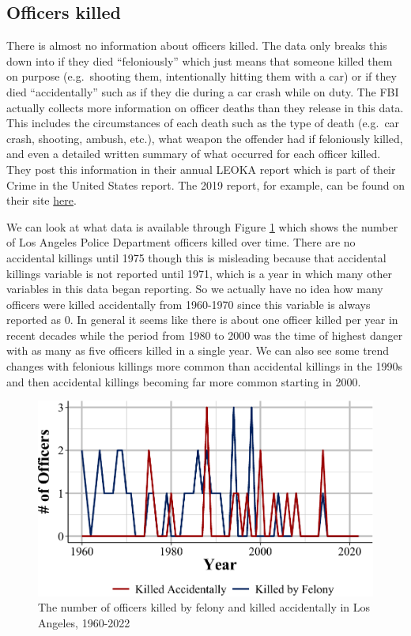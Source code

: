 \documentclass[
  12pt,
  openany]{book}
\begin{document}
\subsection{Officers killed}\label{officers-killed}

There is almost no information about officers killed. The data only breaks this down into if they died ``feloniously'' which just means that someone killed them on purpose (e.g.~shooting them, intentionally hitting them with a car) or if they died ``accidentally'' such as if they die during a car crash while on duty. The FBI actually collects more information on officer deaths than they release in this data. This includes the circumstances of each death such as the type of death (e.g.~car crash, shooting, ambush, etc.), what weapon the offender had if feloniously killed, and even a detailed written summary of what occurred for each officer killed. They post this information in their annual LEOKA report which is part of their Crime in the United States report. The 2019 report, for example, can be found on their site \href{https://ucr.fbi.gov/leoka/2019/home}{here}.

We can look at what data is available through Figure \ref{fig:leokaOfficersKilled} which shows the number of Los Angeles Police Department officers killed over time. There are no accidental killings until 1975 though this is misleading because that accidental killings variable is not reported until 1971, which is a year in which many other variables in this data began reporting. So we actually have no idea how many officers were killed accidentally from 1960-1970 since this variable is always reported as 0. In general it seems like there is about one officer killed per year in recent decades while the period from 1980 to 2000 was the time of highest danger with as many as five officers killed in a single year. We can also see some trend changes with felonious killings more common than accidental killings in the 1990s and then accidental killings becoming far more common starting in 2000.

\begin{figure}

{\centering \includegraphics[width=0.9\linewidth]{07_leoka_files/figure-latex/leokaOfficersKilled-1} 

}

\caption{The number of officers killed by felony and killed accidentally in Los Angeles, 1960-2022}\label{fig:leokaOfficersKilled}
\end{figure}
\end{document}

